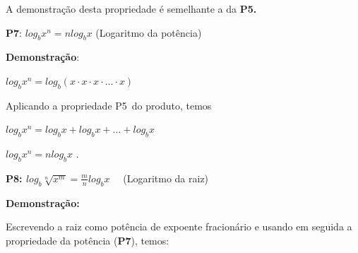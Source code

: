 \documentclass[12pt]{article}
\begin{document}
\begin{enumerate}[label*={\fontsize{14pt}{14pt}\selectfont \textbf{\arabic*.}}]
\begin{justify}
\tab A demonstração desta propriedade é semelhante a da\textbf{ P5.}
\end{justify}\par


\vspace{\baselineskip}
\begin{justify}
\textbf{P7}:  \( log_{b}x^{n}=nlog_{b}x \) \tab \tab (Logaritmo da potência)
\end{justify}\par

\begin{justify}
\textbf{Demonstração}:
\end{justify}\par

\begin{justify}
\tab \tab  \( log_{b}x^{n}=log_{b} \left( x \cdot x \cdot x \cdot  \ldots  \cdot x \right)  \) \tab 
\end{justify}\par

\begin{justify}
Aplicando a propriedade P5\  do produto, temos
\end{justify}\par

\begin{justify}
\tab \tab  \( log_{b}x^{n}=log_{b}x+ log_{b}x+  \ldots +log_{b}x \) 
\end{justify}\par

\begin{justify}
\tab \tab  \( log_{b}x^{n}=nlog_{b}x \) .
\end{justify}\par


\vspace{\baselineskip}
\begin{justify}
\textbf{P8: \tab   \( log_{b}\sqrt[n]{x^{m}}=\frac{m}{n}log_{b}x \) }\   \  (Logaritmo da raiz)
\end{justify}\par

\begin{justify}
\textbf{Demonstração:}
\end{justify}\par

\begin{justify}
Escrevendo a raiz como potência de expoente fracionário e usando em seguida a propriedade da potência (\textbf{P7}), temos: 
\end{justify}\par


\end{enumerate}
\end{document}
